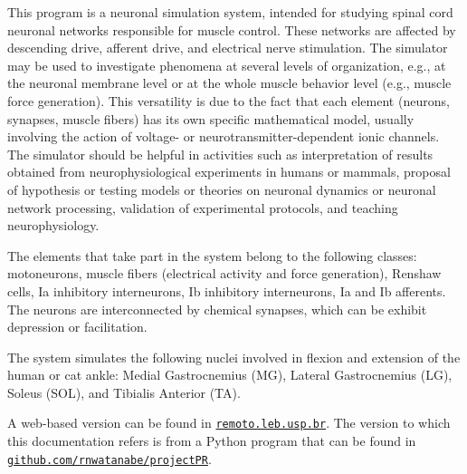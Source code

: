This program is a neuronal simulation system, intended for studying spinal cord neuronal networks responsible for muscle control. These networks are affected by descending drive, afferent drive, and electrical nerve stimulation. The simulator may be used to investigate phenomena at several levels of organization, e.\-g., at the neuronal membrane level or at the whole muscle behavior level (e.\-g., muscle force generation). This versatility is due to the fact that each element (neurons, synapses, muscle fibers) has its own specific mathematical model, usually involving the action of voltage-\/ or neurotransmitter-\/dependent ionic channels. The simulator should be helpful in activities such as interpretation of results obtained from neurophysiological experiments in humans or mammals, proposal of hypothesis or testing models or theories on neuronal dynamics or neuronal network processing, validation of experimental protocols, and teaching neurophysiology.

The elements that take part in the system belong to the following classes\-: motoneurons, muscle fibers (electrical activity and force generation), Renshaw cells, Ia inhibitory interneurons, Ib inhibitory interneurons, Ia and Ib afferents. The neurons are interconnected by chemical synapses, which can be exhibit depression or facilitation.

The system simulates the following nuclei involved in flexion and extension of the human or cat ankle\-: Medial Gastrocnemius (M\-G), Lateral Gastrocnemius (L\-G), Soleus (S\-O\-L), and Tibialis Anterior (T\-A).

A web-\/based version can be found in \href{http://remoto.leb.usp.br/remoto/index.html}{\tt remoto.\-leb.\-usp.\-br}. The version to which this documentation refers is from a Python program that can be found in \href{https://github.com/rnwatanabe/projectPR}{\tt github.\-com/rnwatanabe/project\-P\-R}. 